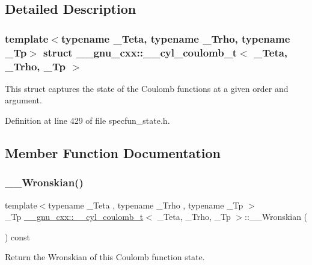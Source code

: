 \subsection{Detailed Description}
\subsubsection*{template$<$typename \+\_\+\+Teta, typename \+\_\+\+Trho, typename \+\_\+\+Tp$>$\newline
struct \+\_\+\+\_\+gnu\+\_\+cxx\+::\+\_\+\+\_\+cyl\+\_\+coulomb\+\_\+t$<$ \+\_\+\+Teta, \+\_\+\+Trho, \+\_\+\+Tp $>$}

This struct captures the state of the Coulomb functions at a given order and argument. 

Definition at line 429 of file specfun\+\_\+state.\+h.



\subsection{Member Function Documentation}
\mbox{\label{struct____gnu__cxx_1_1____cyl__coulomb__t_a7ce3df5dd80026df89e43b37c9efe36f}} 
\subsubsection{\texorpdfstring{\+\_\+\+\_\+\+Wronskian()}{\_\_Wronskian()}}
{\footnotesize\ttfamily template$<$typename \+\_\+\+Teta , typename \+\_\+\+Trho , typename \+\_\+\+Tp $>$ \\
\+\_\+\+Tp \hyperlink{struct____gnu__cxx_1_1____cyl__coulomb__t}{\+\_\+\+\_\+gnu\+\_\+cxx\+::\+\_\+\+\_\+cyl\+\_\+coulomb\+\_\+t}$<$ \+\_\+\+Teta, \+\_\+\+Trho, \+\_\+\+Tp $>$\+::\+\_\+\+\_\+\+Wronskian (\begin{DoxyParamCaption}{ }\end{DoxyParamCaption}) const\hspace{0.3cm}{\ttfamily [inline]}}



Return the Wronskian of this Coulomb function state. 



